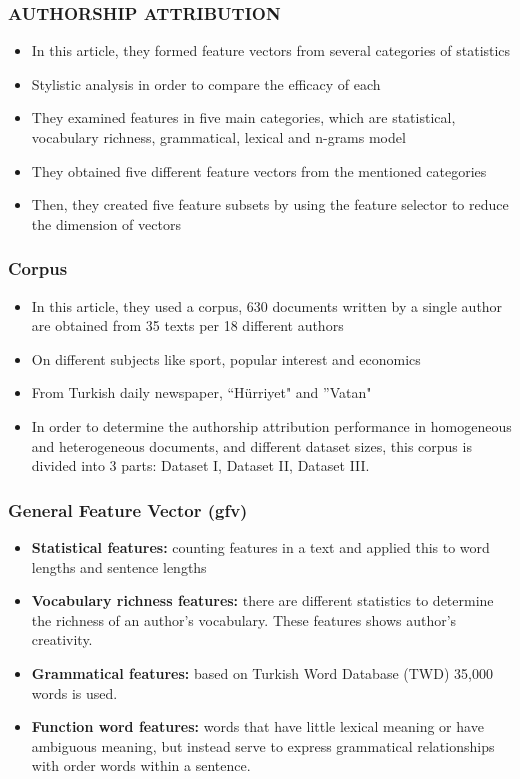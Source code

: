\documentclass{beamer}
\begin{document}
 \begin{frame}
  \frametitle{AUTHORSHIP ATTRIBUTION}
  \begin{itemize}
   \item In this article, they formed feature vectors from several categories of statistics
   \item Stylistic analysis in order to compare the efficacy of each
   \item They examined features in five main categories, which are statistical, vocabulary richness, grammatical, 
   lexical and n-grams model
   \item They obtained five different feature vectors from the mentioned categories
   \item Then, they created five feature subsets by using the feature selector to reduce the dimension of vectors
  \end{itemize}
 \end{frame}

 \begin{frame}
  \frametitle{Corpus}
  \begin{itemize}
   \item In this article, they used a corpus, 630 documents written by a single author are obtained from 35 texts per 
   18 different authors
   \item On different subjects like sport, popular interest and economics
   \item From Turkish daily newspaper, ``Hürriyet" and ''Vatan"
   \item In order to determine the authorship attribution performance in homogeneous and heterogeneous documents, 
   and different dataset sizes, this corpus is divided into 3 parts: Dataset I, Dataset II, Dataset III.
  \end{itemize}
 \end{frame}

 \begin{frame}
  \frametitle{General Feature Vector (gfv)}
  \begin{itemize}
   \item \textbf{Statistical features:} counting features in a text and applied this to word lengths and sentence lengths 
   \item \textbf{Vocabulary richness features:} there are different statistics to determine the richness of an author's vocabulary. 
   These features shows author's creativity.
   \item \textbf{Grammatical features:} based on Turkish Word Database (TWD) 35,000 words is used.
   \item \textbf{Function word features:} words that have little lexical meaning or have ambiguous meaning, 
   but instead serve to express grammatical relationships with order words within a sentence. 
  \end{itemize}
 \end{frame}
 
\end{document}
